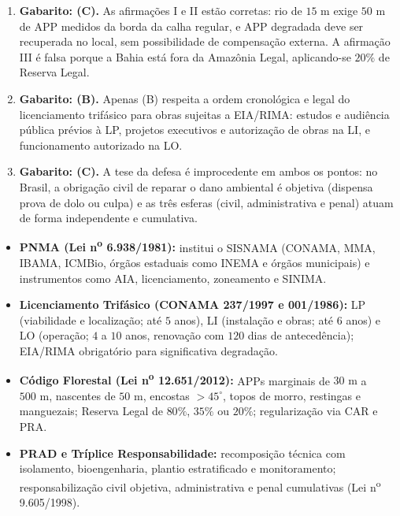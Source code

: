 \begin{boxGabarito}
\begin{enumerate}[leftmargin=1.6em, itemsep=4pt]
  \item \textbf{Gabarito: (C).} As afirmações I e II estão corretas: rio de $15\text{ m}$ exige $50\text{ m}$ de APP medidos da borda da calha regular, e APP degradada deve ser recuperada no local, sem possibilidade de compensação externa. A afirmação III é falsa porque a Bahia está fora da Amazônia Legal, aplicando-se $20\%$ de Reserva Legal.
  \item \textbf{Gabarito: (B).} Apenas (B) respeita a ordem cronológica e legal do licenciamento trifásico para obras sujeitas a EIA/RIMA: estudos e audiência pública prévios à LP, projetos executivos e autorização de obras na LI, e funcionamento autorizado na LO.
  \item \textbf{Gabarito: (C).} A tese da defesa é improcedente em ambos os pontos: no Brasil, a obrigação civil de reparar o dano ambiental é objetiva (dispensa prova de dolo ou culpa) e as três esferas (civil, administrativa e penal) atuam de forma independente e cumulativa.
\end{enumerate}
\end{boxGabarito}

\begin{boxResumo}
\begin{itemize}[leftmargin=1.4em, itemsep=2.5pt]
  \item \textbf{PNMA (Lei n\textsuperscript{o} 6.938/1981):} institui o SISNAMA (CONAMA, MMA, IBAMA, ICMBio, órgãos estaduais como INEMA e órgãos municipais) e instrumentos como AIA, licenciamento, zoneamento e SINIMA.
  \item \textbf{Licenciamento Trifásico (CONAMA 237/1997 e 001/1986):} LP (viabilidade e localização; até $5$ anos), LI (instalação e obras; até $6$ anos) e LO (operação; $4$ a $10$ anos, renovação com $120$ dias de antecedência); EIA/RIMA obrigatório para significativa degradação.
  \item \textbf{Código Florestal (Lei n\textsuperscript{o} 12.651/2012):} APPs marginais de $30\text{ m}$ a $500\text{ m}$, nascentes de $50\text{ m}$, encostas $> 45^\circ$, topos de morro, restingas e manguezais; Reserva Legal de $80\%$, $35\%$ ou $20\%$; regularização via CAR e PRA.
  \item \textbf{PRAD e Tríplice Responsabilidade:} recomposição técnica com isolamento, bioengenharia, plantio estratificado e monitoramento; responsabilização civil objetiva, administrativa e penal cumulativas (Lei n\textsuperscript{o} 9.605/1998).
\end{itemize}
\end{boxResumo}

